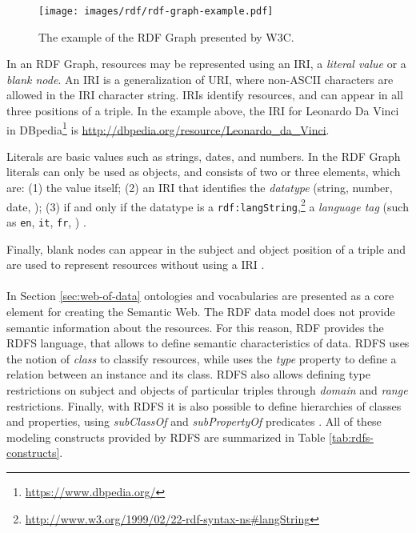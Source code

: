 \begin{figure}[!ht]
    \centering
    \texttt{[image: images/rdf/rdf-graph-example.pdf]}
    \caption{The example of the \ac{RDF} Graph presented by \ac{W3C}.}
    \label{fig:rdf-graph-examle}
\end{figure}

In an \ac{RDF} Graph, resources may be represented using an \ac{IRI}, a \textit{literal value} or a \textit{blank node}. An \ac{IRI} is a generalization of \ac{URI}, where non-\acs{ASCII} characters are allowed in the \ac{IRI} character string. \acp{IRI} identify resources, and can appear in all three positions of a triple. In the example above, the \ac{IRI} for Leonardo Da Vinci in DBpedia\footnote{\url{https://www.dbpedia.org/}} is \url{http://dbpedia.org/resource/Leonardo_da_Vinci}.

Literals are basic values such as strings, dates, and numbers. In the \ac{RDF} Graph literals can only be used as objects, and consists of two or three elements, which are: (1) the value itself; (2) an \ac{IRI} that identifies the \textit{datatype} (string, number, date, \etc); (3) if and only if the datatype is a \texttt{rdf:langString},\footnote{\url{http://www.w3.org/1999/02/22-rdf-syntax-ns\#langString}} a \textit{language tag} (such as \texttt{en}, \texttt{it}, \texttt{fr}, \etc) \cite{world2014rdfconcepts}.

Finally, blank nodes can appear in the subject and object position of a triple and are used to represent resources without using a \ac{IRI} \cite{world2014rdfprimer}.

\paragraph*{}
In Section \ref{sec:web-of-data} ontologies and vocabularies are presented as a core element for creating the Semantic Web. The \ac{RDF} data model does not provide semantic information about the resources. For this reason, \ac{RDF} provides the \ac{RDFS} language, that allows to define semantic characteristics of data. \acl{RDFS} uses the notion of \textit{class} to classify resources, while uses the \textit{type} property to define a relation between an instance and its class. \acl{RDFS} also allows defining type restrictions on subject and objects of particular triples through \textit{domain} and \textit{range} restrictions. Finally, with \acl{RDFS} it is also possible to define hierarchies of classes and properties, using \textit{subClassOf} and \textit{subPropertyOf} predicates \cite{world2014rdfprimer}. All of these modeling constructs provided by \acl{RDFS} are summarized in Table \ref{tab:rdfs-constructs}.

